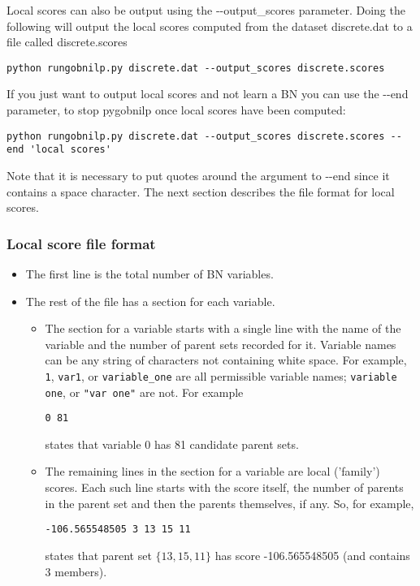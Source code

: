 \documentclass{article}
\newcommand{\pygobnilp}{\textsf{pygobnilp}}
\begin{document}
Local scores can also be output using the -{}-output\_scores
parameter. Doing the following will output the local scores computed from the
dataset discrete.dat to a file called discrete.scores
\begin{verbatim}
python rungobnilp.py discrete.dat --output_scores discrete.scores
\end{verbatim}
If you just want to output local scores and not learn a BN you can use
the -{}-end parameter, to stop \pygobnilp{} once local scores have
been computed:
\begin{verbatim}
python rungobnilp.py discrete.dat --output_scores discrete.scores --end 'local scores'
\end{verbatim}
Note that it is necessary to put quotes around the argument to -{}-end
since it contains a space character. The next section describes the
file format for local scores.

\subsubsection{Local score file format}
\label{sec:scorefileformat}

\begin{itemize}
\item The first line is the total number of BN variables.
\item The rest of the file has a section for each variable.
\begin{itemize}
\item The section for a variable starts with a single line with the
  name of the variable and the number of parent sets recorded for
  it. Variable names can be any string of characters not containing
  white space.  For example, \texttt{1}, \texttt{var1}, or
  \texttt{variable\_one} are all permissible variable names;
  \texttt{variable one}, or \texttt{"var one"} are not.  For example

\texttt{0 81}

states that variable 0 has 81 candidate parent sets.
\item The remaining lines in the section for a variable are local ('family') scores. Each such line starts with the score itself, the number of parents in the parent set and then the parents themselves, if any. So, for example,

\texttt{-106.565548505 3 13 15 11}

states that parent set $\{13,15,11\}$ has score -106.565548505 (and contains 3 members).
\end{itemize}
\end{itemize}
\end{document}

